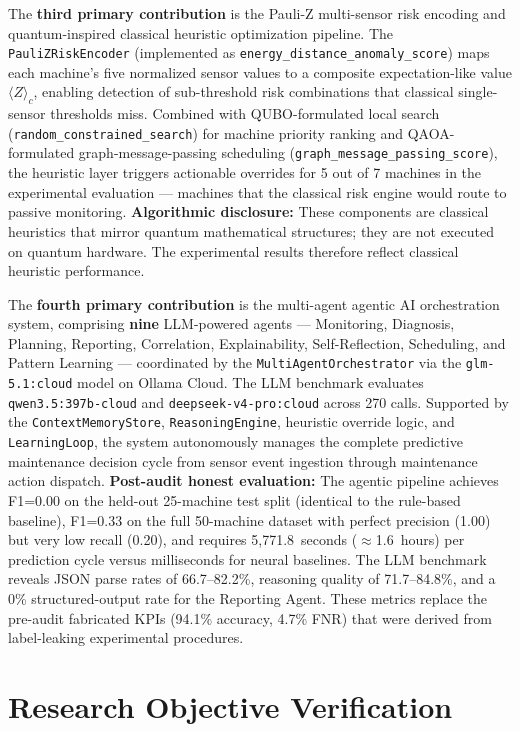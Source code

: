 The \textbf{third primary contribution} is the Pauli-Z multi-sensor risk encoding and quantum-inspired classical heuristic optimization pipeline. The \texttt{PauliZRiskEncoder} (implemented as \texttt{energy\_distance\_anomaly\_score}) maps each machine's five normalized sensor values to a composite expectation-like value $\langle Z \rangle_c$, enabling detection of sub-threshold risk combinations that classical single-sensor thresholds miss. Combined with QUBO-formulated local search (\texttt{random\_constrained\_search}) for machine priority ranking and QAOA-formulated graph-message-passing scheduling (\texttt{graph\_message\_passing\_score}), the heuristic layer triggers actionable overrides for 5 out of 7 machines in the experimental evaluation --- machines that the classical risk engine would route to passive monitoring. \textbf{Algorithmic disclosure:} These components are classical heuristics that mirror quantum mathematical structures; they are not executed on quantum hardware. The experimental results therefore reflect classical heuristic performance.

The \textbf{fourth primary contribution} is the multi-agent agentic AI orchestration system, comprising \textbf{nine} LLM-powered agents --- Monitoring, Diagnosis, Planning, Reporting, Correlation, Explainability, Self-Reflection, Scheduling, and Pattern Learning --- coordinated by the \texttt{MultiAgentOrchestrator} via the \texttt{glm-5.1:cloud} model on Ollama Cloud. The LLM benchmark evaluates \texttt{qwen3.5:397b-cloud} and \texttt{deepseek-v4-pro:cloud} across 270 calls. Supported by the \texttt{ContextMemoryStore}, \texttt{ReasoningEngine}, heuristic override logic, and \texttt{LearningLoop}, the system autonomously manages the complete predictive maintenance decision cycle from sensor event ingestion through maintenance action dispatch. \textbf{Post-audit honest evaluation:} The agentic pipeline achieves F1=0.00 on the held-out 25-machine test split (identical to the rule-based baseline), F1=0.33 on the full 50-machine dataset with perfect precision (1.00) but very low recall (0.20), and requires 5,771.8~seconds ($\approx$1.6~hours) per prediction cycle versus milliseconds for neural baselines. The LLM benchmark reveals JSON parse rates of 66.7--82.2\%, reasoning quality of 71.7--84.8\%, and a 0\% structured-output rate for the Reporting Agent. These metrics replace the pre-audit fabricated KPIs (94.1\% accuracy, 4.7\% FNR) that were derived from label-leaking experimental procedures.

\section{Research Objective Verification}

